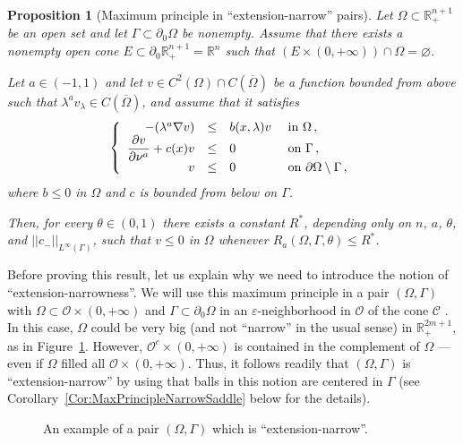 \documentclass[12pt,reqno]{amsart}
\newtheorem{proposition}[theorem]{Proposition}
\theoremstyle{definition}
\theoremstyle{remark}
\newcommand{\con}[1]{\mathbb{#1}}
\newcommand{\R}{\con{R}} %
\newcommand{\ccal}{\mathscr{C}}
\newcommand{\ocal}{\mathcal{O}}
\newcommand{\norm}[1]{\left | \left |{#1} \right | \right |}
\newcommand\beqc[1]{\left\{\begin{array}{#1}}
\newcommand\eeqc{\end{array} \right.}
\def\PDEsystem{rcll}
\let\div\relax
\DeclareMathOperator{\div}{div}
\numberwithin{equation}{section}
\begin{document}
\begin{proposition}[Maximum principle in ``extension-narrow'' pairs]
	\label{Prop:MaxPrincipleNarrow}
	Let $\Omega \subset \R^{n+1}_+$ be an open set and let $\Gamma \subset \partial_0 \Omega$ be nonempty. Assume that there exists a nonempty open cone $E\subset \partial_0 \R^{n+1}_+ = \R^n$ such that $(E \times (0,+\infty))\cap \Omega=\varnothing$. 
	
	Let $a\in (-1,1)$ and let $v \in C^2 (\Omega)\cap C(\overline{\Omega})$ be a function bounded from above such that $\lambda^a v_\lambda \in C (\overline{\Omega})$, and assume that it satisfies
	\begin{equation}
	\label{Eq:MaxPrincipleNarrow}
	\beqc{\PDEsystem}
	-\div(\lambda^a \nabla v) &\leq& b(x,\lambda) v & \text{ in } \Omega\,, \\
	\dfrac{\partial v}{\partial \nu^a}  + c(x) v &\leq & 0 & \text{ on } \Gamma \,, \\
	v & \leq & 0 & \text{ on } \partial \Omega \setminus \Gamma \,,
	\eeqc
	\end{equation}
	where $b \leq 0$ in $\Omega$ and $c$ is bounded from below on $\Gamma$.
	
	Then, for every $\theta \in (0,1)$ there exists a constant $R^*$, depending only on $n$, $a$, $\theta$, and $\norm{c_-}_{L^\infty(\Gamma)}$, such that $v\leq 0 $ in $\Omega$ whenever $R_a(\Omega,\Gamma,\theta) \leq R^*$.
\end{proposition}



Before proving this result, let us explain why we need to introduce the notion of ``extension-narrowness''\!. We will use this maximum principle in a pair $(\Omega, \Gamma)$ with $\Omega \subset \ocal \times (0,+\infty)$ and $\Gamma \subset \partial_0 \Omega$ in an $\varepsilon$-neighborhood in $\ocal$ of the cone $\ccal$ . In this case, $\Omega$ could  be very big (and not ``narrow'' in the usual sense) in $\R^{2m+1}_+$, as in Figure~\ref{Fig:ExtensionNarrow}. However, $\ocal^c\times (0,+\infty)$ is contained in the complement of $\Omega$ --- even if $\Omega$ filled all $\ocal\times (0,+\infty)$. Thus, it follows readily that $(\Omega,\Gamma)$ is ``extension-narrow'' by using that balls in this notion are centered in $\Gamma$ (see Corollary~\ref{Cor:MaxPrincipleNarrowSaddle} below for the details).

\begin{figure}

\caption{An example of a pair $(\Omega,\Gamma)$ which is ``extension-narrow''\!.}
\label{Fig:ExtensionNarrow}
\end{figure}
\end{document}
